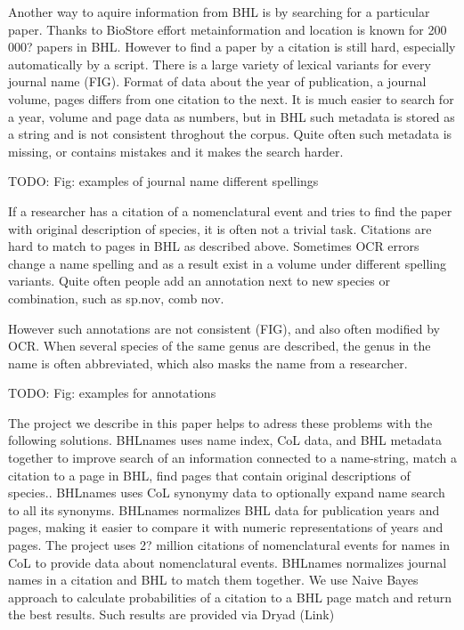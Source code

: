 \documentclass[
]{article}
\begin{document}
Another way to aquire information from BHL is by searching for a
particular paper. Thanks to BioStore effort metainformation and location
is known for 200 000? papers in BHL. However to find a paper by a
citation is still hard, especially automatically by a script. There is a
large variety of lexical variants for every journal name (FIG). Format
of data about the year of publication, a journal volume, pages differs
from one citation to the next. It is much easier to search for a year,
volume and page data as numbers, but in BHL such metadata is stored as a
string and is not consistent throghout the corpus. Quite often such
metadata is missing, or contains mistakes and it makes the search
harder.

TODO: Fig: examples of journal name different spellings

If a researcher has a citation of a nomenclatural event and tries to
find the paper with original description of species, it is often not a
trivial task. Citations are hard to match to pages in BHL as described
above. Sometimes OCR errors change a name spelling and as a result exist
in a volume under different spelling variants. Quite often people add an
annotation next to new species or combination, such as sp.nov, comb nov.

However such annotations are not consistent (FIG), and also often
modified by OCR. When several species of the same genus are described,
the genus in the name is often abbreviated, which also masks the name
from a researcher.

TODO: Fig: examples for annotations

The project we describe in this paper helps to adress these problems
with the following solutions. BHLnames uses name index, CoL data, and
BHL metadata together to improve search of an information connected to a
name-string, match a citation to a page in BHL, find pages that contain
original descriptions of species.. BHLnames uses CoL synonymy data to
optionally expand name search to all its synonyms. BHLnames normalizes
BHL data for publication years and pages, making it easier to compare it
with numeric representations of years and pages. The project uses 2?
million citations of nomenclatural events for names in CoL to provide
data about nomenclatural events. BHLnames normalizes journal names in a
citation and BHL to match them together. We use Naive Bayes approach to
calculate probabilities of a citation to a BHL page match and return the
best results. Such results are provided via Dryad (Link)
\end{document}
